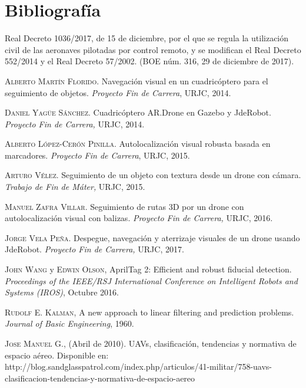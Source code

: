 \documentclass[a4paper, 12pt, oneside]{book}
\begin{document}
\chapter{Bibliografía}
\begin{thebibliography}{X}
 Real Decreto 1036/2017, de 15 de diciembre, por el que se regula la utilización 
civil  de  las  aeronaves  pilotadas  por  control  remoto,  y  se  modifican  el  Real  
Decreto 552/2014 y el Real Decreto 57/2002. (BOE núm. 316, 29 de diciembre de 2017).

 \textsc{Alberto Martín Florido.} Navegación visual en un cuadricóptero para el seguimiento de objetos. \textit{Proyecto Fin de Carrera}, URJC, 2014.	

 \textsc{Daniel Yagüe Sánchez.} Cuadricóptero AR.Drone en Gazebo y JdeRobot. \textit{Proyecto Fin de Carrera,} URJC, 2014.

 \textsc{Alberto López-Cerón Pinilla.} Autolocalización visual robusta basada en marcadores. \textit{Proyecto Fin de Carrera}, URJC, 2015.

 \textsc{Arturo Vélez.}  Seguimiento de un objeto con textura desde un drone con cámara. \textit{Trabajo de Fin de Máter,} URJC, 2015.

 \textsc{Manuel Zafra Villar.} Seguimiento de rutas 3D por un drone con autolocalización visual con balizas. \textit{Proyecto Fin de Carrera,} URJC, 2016.

 \textsc{Jorge Vela Peña.} Despegue, navegación y aterrizaje visuales de un drone usando JdeRobot. \textit{Proyecto Fin de Carrera,} URJC, 2017. 

 \textsc{John Wang} y \textsc{Edwin Olson}, AprilTag 2: Efficient and robust fiducial detection. \textit{Proceedings of the IEEE/RSJ International Conference on Intelligent Robots and Systems (IROS)}, Octubre 2016.
	
 \textsc{Rudolf E. Kalman}, A new approach to linear filtering and prediction problems.
\textit{Journal of Basic Engineering}, 1960.

 \textsc{Jose Manuel G.}, (Abril de 2010). UAVs, clasificación, tendencias y normativa de espacio aéreo. Disponible en: \\ http://blog.sandglasspatrol.com/index.php/articulos/41-militar/758-uavs-clasificacion-tendencias-y-normativa-de-espacio-aereo



\end{thebibliography} 
\end{document}
